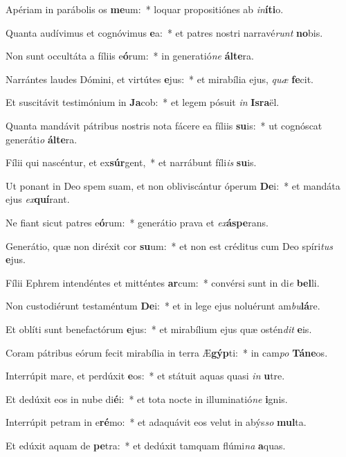 \item Apériam in parábolis os \textbf{me}um:~* loquar propositiónes ab \textit{in}\textbf{í}\textbf{ti}o.
\item Quanta audívimus et cognóvimus \textbf{e}a:~* et patres nostri narravé\textit{runt} \textbf{no}bis.
\item Non sunt occultáta a fíliis e\textbf{ó}rum:~* in generatió\textit{ne} \textbf{ál}\textbf{te}ra.
\item Narrántes laudes Dómini, et virtútes \textbf{e}jus:~* et mirabília ejus, \textit{quæ} \textbf{fe}cit.
\item Et suscitávit testimónium in \textbf{Ja}cob:~* et legem pósuit \textit{in} \textbf{Is}\textbf{ra}ël.
\item Quanta mandávit pátribus nostris nota fácere ea fíliis \textbf{su}is:~* ut cognóscat generáti\textit{o} \textbf{ál}\textbf{te}ra.
\item Fílii qui nascéntur, et ex\textbf{súr}gent,~* et narrábunt fíli\textit{is} \textbf{su}is.
\item Ut ponant in Deo spem suam, et non obliviscántur óperum \textbf{De}i:~* et mandáta ejus \textit{ex}\textbf{quí}rant.
\item Ne fiant sicut patres e\textbf{ó}rum:~* generátio prava et \textit{ex}\textbf{ás}\textbf{pe}rans.
\item Generátio, quæ non diréxit cor \textbf{su}um:~* et non est créditus cum Deo spíri\textit{tus} \textbf{e}jus.
\item Fílii Ephrem intendéntes et mitténtes \textbf{ar}cum:~* convérsi sunt in di\textit{e} \textbf{bel}li.
\item Non custodiérunt testaméntum \textbf{De}i:~* et in lege ejus noluérunt am\textit{bu}\textbf{lá}re.
\item Et oblíti sunt benefactórum \textbf{e}jus:~* et mirabílium ejus quæ ostén\textit{dit} \textbf{e}is.
\item Coram pátribus eórum fecit mirabília in terra Æ\textbf{gýp}ti:~* in cam\textit{po} \textbf{Tá}\textbf{ne}os.
\item Interrúpit mare, et perdúxit \textbf{e}os:~* et státuit aquas quasi \textit{in} \textbf{u}tre.
\item Et dedúxit eos in nube di\textbf{é}i:~* et tota nocte in illuminatió\textit{ne} \textbf{i}gnis.
\item Interrúpit petram in e\textbf{ré}mo:~* et adaquávit eos velut in abýs\textit{so} \textbf{mul}ta.
\item Et edúxit aquam de \textbf{pe}tra:~* et dedúxit tamquam flúmi\textit{na} \textbf{a}quas.
